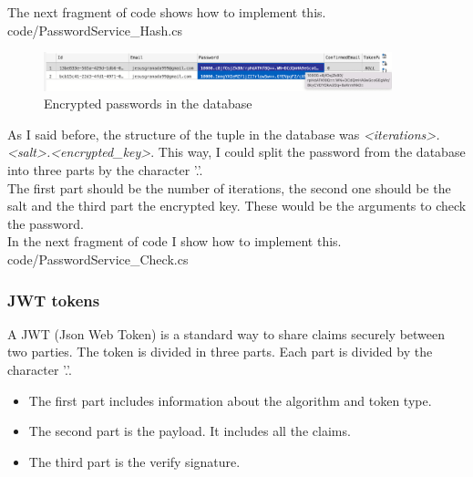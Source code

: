         The next fragment of code shows how to implement this. \\

        
        {code/PasswordService_Hash.cs}

        \begin{figure}[H]
            \centering
                \includegraphics[width=0.9\textwidth]{assets/users_database.png}
            \caption{Encrypted passwords in the database}
            \label{fig:user_database}
        \end{figure}

        As I said before, the structure of the tuple in the database was \textit{<iterations>.<salt>.<encrypted\_key>}. This way, I could split the password from the database into three parts by the character '.'. \\

        The first part should be the number of iterations, the second one should be the salt and the third part the encrypted key. These would be the arguments to check the password. \\

        In the next fragment of code I show how to implement this. \\

        
        {code/PasswordService_Check.cs}

        \subsubsection{JWT tokens}
        A JWT (Json Web Token) \cite{JWT.io} is a standard way to share claims securely between two parties. The token is divided in three parts. Each part is divided by the character '.'. \\
        \begin{itemize}[noitemsep]
            \item The first part includes information about the algorithm and token type.
            \item The second part is the payload. It includes all the claims.
            \item The third part is the verify signature.
        \end{itemize}

